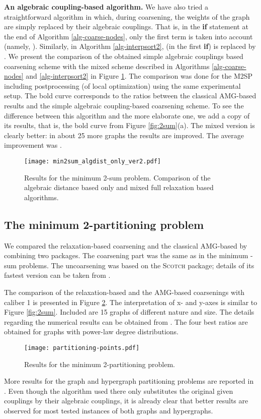 \documentclass[final]{siamltex}
\newcommand{\scotch}{\textsc{Scotch}}
\begin{document}
\par {\bf An algebraic coupling-based algorithm.} We have also tried a straightforward algorithm in which, during coarsening, the weights of the graph are simply replaced by their algebraic couplings. That is, in the {\bf if} statement at the end of Algorithm \ref{alg-coarse-nodes}, only the first term is taken into account (namely,  ). Similarly, in Algorithm \ref{alg-interpsort2},
 (in the first {\bf if}) is replaced by .
We present the comparison of the obtained simple algebraic couplings based coarsening scheme with the mixed scheme described in Algorithms \ref{alg-coarse-nodes} and \ref{alg-interpsort2} in Figure \ref{fig:2sum-algdist-only}. The comparison was done for the M2SP including  postprocessing (of local optimization) using the same experimental setup. The bold curve corresponds to the ratios between the classical AMG-based results and the simple algebraic coupling-based coarsening scheme. To see the difference between this algorithm and the more elaborate one, we add a copy of its results, that is, the bold curve from Figure \ref{fig:2sum}(a). The mixed version is clearly better: in about 25 more graphs the results are improved. The average improvement was .
\begin{figure}[h]
\centering
\texttt{[image: min2sum\_algdist\_only\_ver2.pdf]}\\
\caption{Results for the minimum 2-sum problem. Comparison of the algebraic distance based only and mixed full relaxation based algorithms.}\label{fig:2sum-algdist-only}
\end{figure}



\subsection{The minimum 2-partitioning problem}
\par We compared the relaxation-based coarsening and the classical AMG-based
 by combining two packages. The coarsening part was
 the same as in the minimum -sum problems. The
uncoarsening was based on the \scotch{} package; details of
its fastest version can be taken from \cite{cheval-mlpartcompar}.
\par The comparison of the relaxation-based and the AMG-based coarsenings with caliber
1 is presented in Figure \ref{fig:partitioning}. The
interpretation of x- and y-axes is similar to Figure
\ref{fig:2sum}.
Included are 15 graphs of different nature and size. The details
regarding the numerical results can be obtained from
\cite{safroproj}. The four best ratios are obtained for graphs with
power-law degree distributions.
\begin{figure}[h]
\centering
\texttt{[image: partitioning-points.pdf]}
\caption{Results for the minimum 2-partitioning problem.}\label{fig:partitioning}
\end{figure}
More results for the graph and hypergraph partitioning problems are reported in \cite{chen-safro-algdist-full}. Even though the algorithm used there only substitutes the original given couplings by their algebraic couplings, it is already clear that better results are observed for most tested instances of both graphs and hypergraphs.
\end{document}
